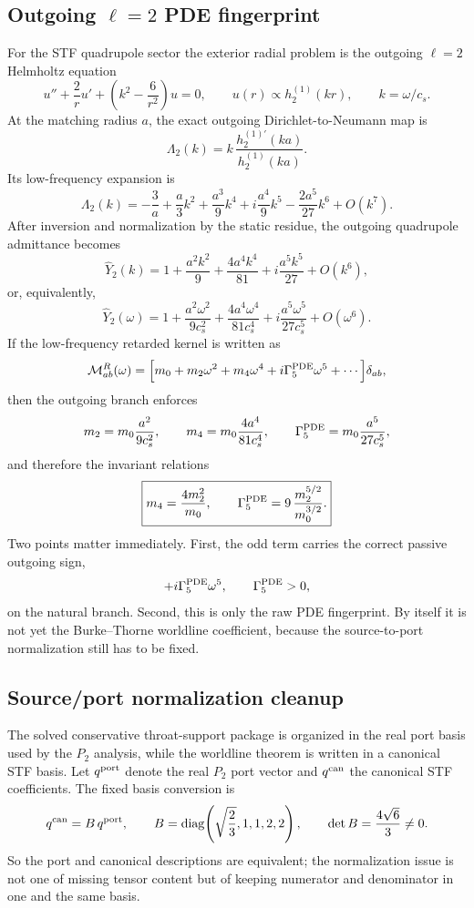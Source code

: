 \documentclass[11pt]{article}
\begin{document}
\subsection{Outgoing \texorpdfstring{$\ell=2$}{ell=2} PDE fingerprint}
\label{app:qnorm-outgoing-l2}

For the STF quadrupole sector the exterior radial problem is the outgoing
$\ell=2$ Helmholtz equation
\[
u''+\frac{2}{r}u'+\left(k^2-\frac{6}{r^2}\right)u=0,
\qquad
u(r)\propto h_2^{(1)}(kr),
\qquad
k=\omega/c_s.
\]
At the matching radius $a$, the exact outgoing Dirichlet-to-Neumann map is
\[
\Lambda_2(k)=k\,\frac{h_2^{(1)\prime}(ka)}{h_2^{(1)}(ka)}.
\]
Its low-frequency expansion is
\[
\Lambda_2(k)
=
-\frac{3}{a}
+\frac{a}{3}k^2
+\frac{a^3}{9}k^4
+i\frac{a^4}{9}k^5
-\frac{2a^5}{27}k^6
+O(k^7).
\]
After inversion and normalization by the static residue, the outgoing quadrupole
admittance becomes
\[
\widehat Y_2(k)
=
1+\frac{a^2k^2}{9}+\frac{4a^4k^4}{81}+i\frac{a^5k^5}{27}+O(k^6),
\]
or, equivalently,
\[
\widehat Y_2(\omega)
=
1+\frac{a^2\omega^2}{9c_s^2}
+\frac{4a^4\omega^4}{81c_s^4}
+i\frac{a^5\omega^5}{27c_s^5}
+O(\omega^6).
\]
If the low-frequency retarded kernel is written as
\[
\mathcal M_{ab}^R(\omega)
=
\Bigl[m_0+m_2\omega^2+m_4\omega^4+i\Gamma_5^{\rm PDE}\omega^5+\cdots\Bigr]\delta_{ab},
\]
then the outgoing branch enforces
\[
m_2=m_0\frac{a^2}{9c_s^2},
\qquad
m_4=m_0\frac{4a^4}{81c_s^4},
\qquad
\Gamma_5^{\rm PDE}=m_0\frac{a^5}{27c_s^5},
\]
and therefore the invariant relations
\begin{equation}
\boxed{
m_4=\frac{4m_2^2}{m_0},
\qquad
\Gamma_5^{\rm PDE}=9\,\frac{m_2^{5/2}}{m_0^{3/2}}.
}
\label{eq:qnorm-raw-branch-invariants}
\end{equation}
Two points matter immediately.  First, the odd term carries the correct passive
outgoing sign,
\[
+i\Gamma_5^{\rm PDE}\omega^5,
\qquad
\Gamma_5^{\rm PDE}>0,
\]
on the natural branch.  Second, this is only the raw PDE fingerprint.  By
itself it is not yet the Burke--Thorne worldline coefficient, because the
source-to-port normalization still has to be fixed.

\subsection{Source/port normalization cleanup}
\label{app:qnorm-source-port}

The solved conservative throat-support package is organized in the real port
basis used by the $P_2$ analysis, while the worldline theorem is written in a
canonical STF basis.  Let $q^{\rm port}$ denote the real $P_2$ port vector and
$q^{\rm can}$ the canonical STF coefficients.  The fixed basis conversion is
\[
q^{\rm can}=B\,q^{\rm port},
\qquad
B=\mathrm{diag}\!\left(\sqrt{\frac23},1,1,2,2\right),
\qquad
\det B=\frac{4\sqrt6}{3}\neq0.
\]
So the port and canonical descriptions are equivalent; the normalization issue
is not one of missing tensor content but of keeping numerator and denominator in
one and the same basis.
\end{document}
